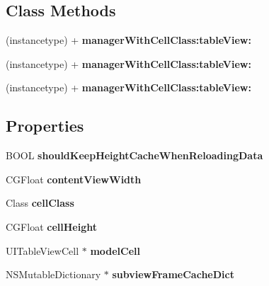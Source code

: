 \subsection*{Class Methods}
\begin{DoxyCompactItemize}
\item 
\mbox{\label{interface_s_d_cell_auto_height_manager_a89f1d70f30e521381f56a3900ca50dca}} 
(instancetype) + {\bfseries manager\+With\+Cell\+Class\+:table\+View\+:}
\item 
\mbox{\label{interface_s_d_cell_auto_height_manager_a89f1d70f30e521381f56a3900ca50dca}} 
(instancetype) + {\bfseries manager\+With\+Cell\+Class\+:table\+View\+:}
\item 
\mbox{\label{interface_s_d_cell_auto_height_manager_a89f1d70f30e521381f56a3900ca50dca}} 
(instancetype) + {\bfseries manager\+With\+Cell\+Class\+:table\+View\+:}
\end{DoxyCompactItemize}
\subsection*{Properties}
\begin{DoxyCompactItemize}
\item 
\mbox{\label{interface_s_d_cell_auto_height_manager_ac8341adde8add3df59a1318d6eab5829}} 
B\+O\+OL {\bfseries should\+Keep\+Height\+Cache\+When\+Reloading\+Data}
\item 
\mbox{\label{interface_s_d_cell_auto_height_manager_a05c9369ba69087203b8641be52dc09cb}} 
C\+G\+Float {\bfseries content\+View\+Width}
\item 
\mbox{\label{interface_s_d_cell_auto_height_manager_ab60a9e7f932dbd8a75655de9258ef1af}} 
Class {\bfseries cell\+Class}
\item 
\mbox{\label{interface_s_d_cell_auto_height_manager_a179c975b645e08d45355fca94e87beae}} 
C\+G\+Float {\bfseries cell\+Height}
\item 
\mbox{\label{interface_s_d_cell_auto_height_manager_a1b8312f8e2a324b672c5f12b2e3bbe42}} 
U\+I\+Table\+View\+Cell $\ast$ {\bfseries model\+Cell}
\item 
\mbox{\label{interface_s_d_cell_auto_height_manager_ae1ef339cc4b329eab8e0b893a1d20262}} 
N\+S\+Mutable\+Dictionary $\ast$ {\bfseries subview\+Frame\+Cache\+Dict}
\end{DoxyCompactItemize}


